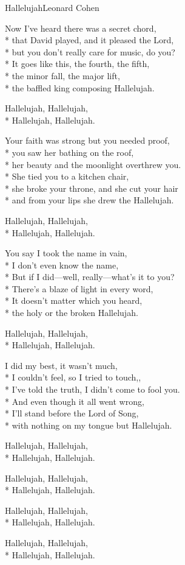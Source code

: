 \documentclass[10.5pt]{book}
\begin{document}
\begin{poem}{Hallelujah}{Leonard Cohen}

\settowidth{\versewidth}{Put him in the bed with the captains daughter,}

Now I've heard there was a secret chord,\\*
that David played, and it pleased the Lord,\\*
but you don't really care for music, do you?\\*
It goes like this, the fourth, the fifth,\\*
the minor fall, the major lift,\\*
the baffled king composing Hallelujah.

Hallelujah, Hallelujah,\\*
Hallelujah, Hallelujah.

Your faith was strong but you needed proof,\\*
you saw her bathing on the roof,\\*
her beauty and the moonlight overthrew you.\\*
She tied you to a kitchen chair,\\*
she broke your throne, and she cut your hair\\*
and from your lips she drew the Hallelujah.

Hallelujah, Hallelujah,\\*
Hallelujah, Hallelujah.

You say I took the name in vain,\\*
I don't even know the name,\\*
But if I did—well, really—what's it to you?\\*
There's a blaze of light in every word,\\*
It doesn't matter which you heard,\\*
the holy or the broken Hallelujah.

Hallelujah, Hallelujah,\\*
Hallelujah, Hallelujah.

I did my best, it wasn't much,\\*
I couldn't feel, so I tried to touch,,\\*
I've told the truth, I didn't come to fool you.\\*
And even though it all went wrong,\\*
I'll stand before the Lord of Song,\\*
with nothing on my tongue but Hallelujah.

Hallelujah, Hallelujah,\\*
Hallelujah, Hallelujah.

Hallelujah, Hallelujah,\\*
Hallelujah, Hallelujah.

Hallelujah, Hallelujah,\\*
Hallelujah, Hallelujah.

Hallelujah, Hallelujah,\\*
Hallelujah, Hallelujah.

\end{poem}
\end{document}

